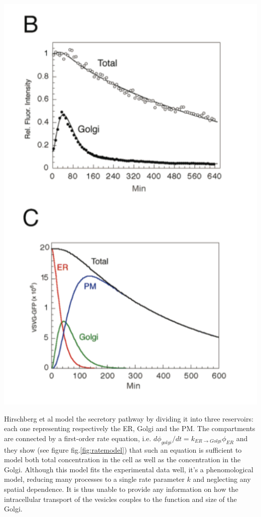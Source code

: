 \documentclass[12pt,a4paper,]{Dissertate}
\let\origfigure\figure
\let\endorigfigure\endfigure
\renewenvironment{figure}[1][2] {
    \expandafter\origfigure\expandafter[H]
} {
    \endorigfigure
}
\begin{document}
\begin{figure}
\hypertarget{fig:ratemodel}{%
\centering
\includegraphics{source/figures/png/kineticmodel.png}
\caption{\textbf{Left panel}: First order rate model fitted to
experimental data by Hirschberg et al. \textbf{Right panel}: Inferred
concentration in ER, Golgi and PM using the fitted parameters from the
left panel and their model. Image taken from 15}\label{fig:ratemodel}
}
\end{figure}

Hirschberg et al model the secretory pathway by dividing it into three
reservoirs: each one representing respectively the ER, Golgi and the PM.
The compartments are connected by a first-order rate equation, i.e.
\(d \phi_{golgi}/dt=k_{ER \to Golgi}\phi_{ER}\) and they show (see
figure fig.\ref{fig:ratemodel}) that such an equation is sufficient to
model both total concentration in the cell as well as the concentration
in the Golgi. Although this model fits the experimental data well, it's
a phenomological model, reducing many processes to a single rate
parameter \(k\) and neglecting any spatial dependence. It is thus unable
to provide any information on how the intracellular transport of the
vesicles couples to the function and size of the Golgi.
\end{document}
